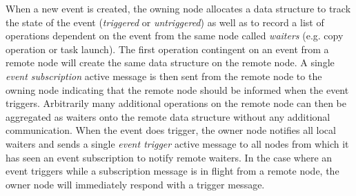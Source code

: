 When a new event is created, the owning node allocates a data structure to track the state of
the event ({\em triggered} or {\em untriggered}) as well as to record a list of operations dependent on the
event from the same node called {\em waiters} (e.g. copy operation or task launch).  The first operation contingent on an event
from a remote node will create the same data structure on the remote node.  A single
{\em event subscription} active message is then sent from the remote node to the owning node indicating
that the remote node should be informed when the event triggers.  Arbitrarily many additional operations on
the remote node can then be aggregated as waiters onto the remote data structure without any additional communication.
When the event does trigger, the owner node notifies all local waiters and
sends a single {\em event trigger} active message to all nodes from which it has seen an event subscription
to notify remote waiters.
In the case where an event triggers while a subscription message is in flight from a remote node, the owner node will
immediately respond with a trigger message.

